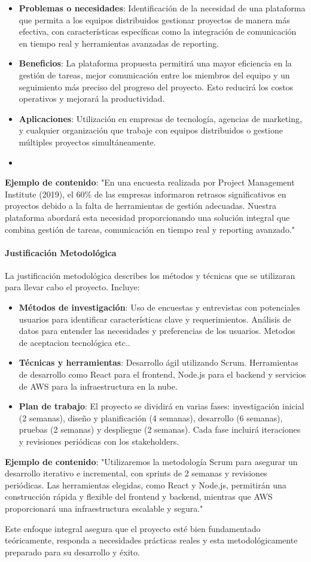 \begin{itemize}
    \item \textbf{Problemas o necesidades}: Identificación de la necesidad de una plataforma que permita a los equipos distribuidos gestionar proyectos de manera más efectiva, con características específicas como la integración de comunicación en tiempo real y herramientas avanzadas de reporting.
    \item \textbf{Beneficios}: La plataforma propuesta permitirá una mayor eficiencia en la gestión de tareas, mejor comunicación entre los miembros del equipo y un seguimiento más preciso del progreso del proyecto. Esto reducirá los costos operativos y mejorará la productividad.
    \item \textbf{Aplicaciones}: Utilización en empresas de tecnología, agencias de marketing, y cualquier organización que trabaje con equipos distribuidos o gestione múltiples proyectos simultáneamente.
    \item 


\end{itemize}
\textbf{Ejemplo de contenido}: "En una encuesta realizada por Project Management Institute (2019), el 60\% de las empresas informaron retrasos significativos en proyectos debido a la falta de herramientas de gestión adecuadas. Nuestra plataforma abordará esta necesidad proporcionando una solución integral que combina gestión de tareas, comunicación en tiempo real y reporting avanzado."

\paragraph{Justificación Metodológica}
La justificación metodológica describes los métodos y técnicas que se utilizaran para llevar cabo el proyecto. Incluye: 

\begin{itemize}
    \item \textbf{Métodos de investigación}: Uso de encuestas y entrevistas con potenciales usuarios para identificar características clave y requerimientos. Análisis de datos para entender las necesidades y preferencias de los usuarios. Metodos de aceptacion tecnológica etc..

    \item \textbf{Técnicas y herramientas}: Desarrollo ágil utilizando Scrum. Herramientas de desarrollo como React para el frontend, Node.js para el backend y servicios de AWS para la infraestructura en la nube.
    \item \textbf{Plan de trabajo}: El proyecto se dividirá en varias fases: investigación inicial (2 semanas), diseño y planificación (4 semanas), desarrollo (6 semanas), pruebas (2  semanas) y despliegue (2 semanas). Cada fase incluirá iteraciones y revisiones periódicas con los stakeholders.


\end{itemize}
\textbf{Ejemplo de contenido}: "Utilizaremos la metodología Scrum para asegurar un desarrollo iterativo e incremental, con sprints de 2 semanas y revisiones periódicas. Las herramientas elegidas, como React y Node.js, permitirán una construcción rápida y flexible del frontend y backend, mientras que AWS proporcionará una infraestructura escalable y segura."

Este enfoque integral asegura que el proyecto esté bien fundamentado teóricamente, responda a necesidades prácticas reales y esta metodológicamente preparado para su desarrollo y éxito.

 
